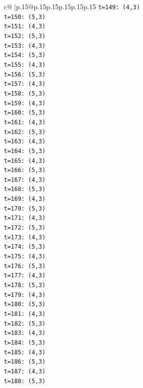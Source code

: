 \documentclass{article}
\begin{document}
{\begin{supertabular}{c@{$\;$}|p{.15\linewidth}@{}p{.15\linewidth}p{.15\linewidth}p{.15\linewidth}p{.15\linewidth}p{.15\linewidth}}
{{{\texttt{t=149: (4,3)} \\
\texttt{t=150: (5,3)} \\
\texttt{t=151: (4,3)} \\
\texttt{t=152: (5,3)} \\
\texttt{t=153: (4,3)} \\
\texttt{t=154: (5,3)} \\
\texttt{t=155: (4,3)} \\
\texttt{t=156: (5,3)} \\
\texttt{t=157: (4,3)} \\
\texttt{t=158: (5,3)} \\
\texttt{t=159: (4,3)} \\
\texttt{t=160: (5,3)} \\
\texttt{t=161: (4,3)} \\
\texttt{t=162: (5,3)} \\
\texttt{t=163: (4,3)} \\
\texttt{t=164: (5,3)} \\
\texttt{t=165: (4,3)} \\
\texttt{t=166: (5,3)} \\
\texttt{t=167: (4,3)} \\
\texttt{t=168: (5,3)} \\
\texttt{t=169: (4,3)} \\
\texttt{t=170: (5,3)} \\
\texttt{t=171: (4,3)} \\
\texttt{t=172: (5,3)} \\
\texttt{t=173: (4,3)} \\
\texttt{t=174: (5,3)} \\
\texttt{t=175: (4,3)} \\
\texttt{t=176: (5,3)} \\
\texttt{t=177: (4,3)} \\
\texttt{t=178: (5,3)} \\
\texttt{t=179: (4,3)} \\
\texttt{t=180: (5,3)} \\
\texttt{t=181: (4,3)} \\
\texttt{t=182: (5,3)} \\
\texttt{t=183: (4,3)} \\
\texttt{t=184: (5,3)} \\
\texttt{t=185: (4,3)} \\
\texttt{t=186: (5,3)} \\
\texttt{t=187: (4,3)} \\
\texttt{t=188: (5,3)} \\
}}}
\end{supertabular}}
\end{document}
